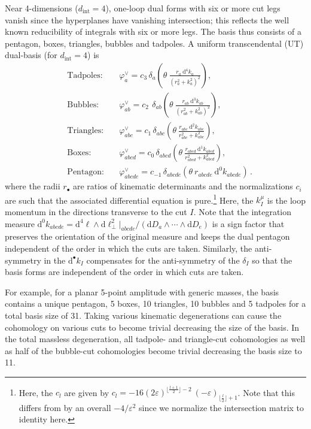 \documentclass[11pt]{article}
\renewcommand{\d}{\text{d}}
\newcommand{\dint}{d_\text{int}}
\newcommand{\vphi}{\varphi}
\newcommand{\vep}{\varepsilon}
\renewcommand{\th}{\theta}
\begin{document}
Near 4-dimensions ($\dint=4$), one-loop
dual forms with six or more cut legs vanish since the hyperplanes have vanishing intersection;  this reflects the well known reducibility of integrals with six or more legs.
The basis thus consists of a pentagon, boxes, triangles, bubbles and tadpoles.
A uniform transcendental (UT) dual-basis (for $\dint=4$) is \cite{Caron-Huot:2021xqj}
\begin{eqnarray}
	\label{eq:tadpoles}
	&\text{Tadpoles:} \quad
	&\vphi^\vee_{a} = c_3\, \delta_{a} \left( \th\ \frac{ r_{a}\ \d^4 k_{a} }{ (r_{a}^2 + k^2_{a})^2 } \right),
\\
	\label{eq:bubbles}
	&\text{Bubbles:} \quad
	&\vphi^\vee_{ab} = c_{2}\,\ \delta_{ab} \left( \th\ \frac{ r_{ab}\ \d^3 k_{ab} }{ (r_{ab}^2 + k^2_{ab})^2 } \right),
\\
	\label{eq:triangles}\
	&\text{Triangles:} \quad
	&\vphi^\vee_{abc} = c_1\, \delta_{abc} \left( \th\ \frac{ r_{abc}\ \d^2 k_{abc} }{ r_{abc}^2 + k^2_{abc} } \right),
\\
	\label{eq:boxes}
	&\text{Boxes:} \quad
	&\vphi^\vee_{abcd} = c_0\, \delta_{abcd} \left( \th\ \frac{ r_{abcd}\ \d^1 k_{abcd} }{ r_{abcd}^2 + k^2_{abcd} } \right),
\\
	\label{eq:pentagon}
	&\text{Pentagon:} \quad
	&\vphi^\vee_{abcde} = c_{-1}\, \delta_{abcde} \left( \th\ r_{abcde}\ \d^0 k_{abcde} \right) 
\,.
\end{eqnarray}
where the radii $r_\bullet$ are ratios of kinematic determinants and the normalizations $c_i$ are such that the associated differential equation is pure.\footnote{Here, the $c_l$ are given by $c_{l} = -16(2\vep)^{\lfloor\frac{l+1}{2}\rfloor-2}\ (-\vep)_{\lfloor\frac{l}{2}\rfloor+1}$. Note that this differs from \cite{Caron-Huot:2021xqj} by an overall $-4/\vep^2$ since we normalize the intersection matrix to identity here.} 
Here, the $k_I^\mu$ is the loop momentum in the directions transverse to the cut $I$.
Note that the integration measure
$\d^0k_{abcde} = \d^{4}\ell\wedge\d\ell^2_\perp\vert_{abcde}/(\d D_a \wedge \cdots \wedge \d D_e)$ is a sign factor that preserves the orientation of the original measure and keeps the dual pentagon independent of the order in which the cuts are taken. Similarly, the anti-symmetry in the $\d^\bullet k_I$ compensates for the anti-symmetry of the $\delta_I$ so that the basis forms are independent of the order in which cuts are taken. 

For example, for a planar 5-point amplitude with generic masses, the basis contains a unique pentagon, 5 boxes, 10 triangles, 10 bubbles and 5 tadpoles for a total basis size of 31. Taking various kinematic degenerations can cause the cohomology on various cuts to become trivial decreasing the size of the basis. In the total massless degeneration, all tadpole- and triangle-cut cohomologies as well as half of the bubble-cut cohomologies become trivial decreasing the basis size to 11. 
\end{document}
